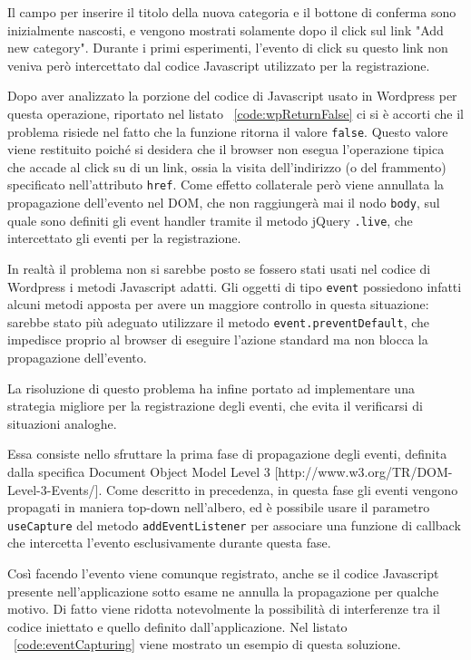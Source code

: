 \documentclass[12pt]{toptesi}
\begin{document}
Il campo per inserire il titolo della nuova categoria e il bottone di conferma sono inizialmente nascosti, e vengono mostrati solamente dopo il click sul link "Add new category". Durante i primi esperimenti, l'evento di click su questo link non veniva però intercettato dal codice Javascript utilizzato per la registrazione.

Dopo aver analizzato la porzione del codice di Javascript usato in Wordpress per questa operazione, riportato nel listato ~\ref{code:wpReturnFalse} ci si è accorti che il problema risiede nel fatto che la funzione ritorna il valore \verb|false|.
Questo valore viene restituito poiché si desidera che il browser non esegua l'operazione tipica che accade al click su di un link, ossia la visita dell'indirizzo (o del frammento) specificato nell'attributo \verb|href|. Come effetto collaterale però viene annullata la propagazione dell'evento nel DOM, che non raggiungerà mai il nodo \verb|body|, sul quale sono definiti gli event handler tramite il metodo jQuery \verb|.live|, che intercettato gli eventi per la registrazione.

In realtà il problema non si sarebbe posto se fossero stati usati nel codice di Wordpress i metodi Javascript adatti. Gli oggetti di tipo \verb|event| possiedono infatti alcuni metodi apposta per avere un maggiore controllo in questa situazione: sarebbe stato più adeguato utilizzare il metodo \verb|event.preventDefault|, che impedisce proprio al browser di eseguire l'azione standard ma non blocca la propagazione dell'evento.



La risoluzione di questo problema ha infine portato ad implementare una strategia migliore per la registrazione degli eventi, che evita il verificarsi di situazioni analoghe.

Essa consiste nello sfruttare la prima fase di propagazione degli eventi, definita dalla specifica Document Object Model Level 3 [http://www.w3.org/TR/DOM-Level-3-Events/]. Come descritto in precedenza, in questa fase gli eventi vengono propagati in maniera top-down nell'albero, ed è possibile usare il parametro \verb|useCapture| del metodo \verb|addEventListener| per associare una funzione di callback che intercetta l'evento esclusivamente durante questa fase.

Così facendo l'evento viene comunque registrato, anche se il codice Javascript presente nell'applicazione sotto esame ne annulla la propagazione per qualche motivo. Di fatto viene ridotta notevolmente la possibilità di interferenze tra il codice iniettato e quello definito dall'applicazione. Nel listato ~\ref{code:eventCapturing} viene mostrato un esempio di questa soluzione.
\end{document}
